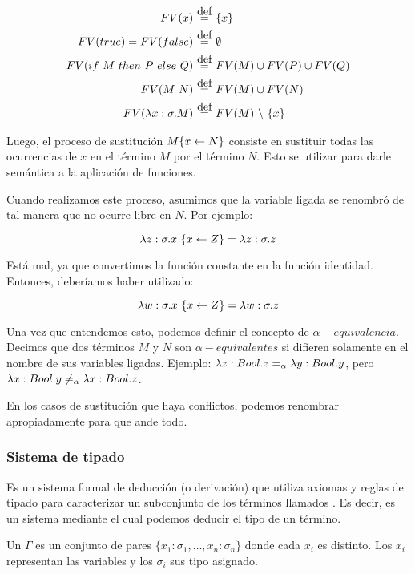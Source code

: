 \begin{align*}
FV(x) &\eqdef \{x\} \\
FV(true) = FV (false) &\eqdef \emptyset \\
FV(\ifte{M}{P}{Q}) &\eqdef FV(M) \cup FV(P) \cup FV(Q) \\
FV(\app{M}{N}) &\eqdef FV(M) \cup FV(N) \\
FV(\abs{x}{\sigma}{M}) &\eqdef FV(M)\ \backslash\ \{x\} \\
\end{align*}

Luego, el proceso de sustitución $M\{x \leftarrow N\}$ consiste en sustituir todas las ocurrencias  de $x$ en el término $M$ por el término $N$. Esto se utilizar para darle semántica a la aplicación de funciones.

Cuando realizamos este proceso, asumimos que la variable ligada se renombró de tal manera que no ocurre libre en $N$. Por ejemplo:

\[ \lambda z:\sigma.x\ \{x\leftarrow Z\} = \lambda z:\sigma.z\]

Está mal, ya que convertimos la función constante  en la función identidad. Entonces, deberíamos haber utilizado:

\[ \lambda w:\sigma.x\ \{x\leftarrow Z\} = \lambda w:\sigma.z\]

Una vez que entendemos esto, podemos definir el concepto de $\alpha-equivalencia$. Decimos que dos términos $M$ y $N$ son $\alpha-equivalentes$ si difieren solamente en el nombre de sus variables ligadas. Ejemplo: $\lambda z:Bool.z =_{\alpha} \lambda y:Bool.y$, pero $\lambda x:Bool.y \neq_{\alpha} \lambda x:Bool.z$.

En los casos de sustitución que haya conflictos, podemos renombrar apropiadamente para que ande todo.

\subsubsection{Sistema de tipado}

Es un sistema formal de deducción (o derivación) que utiliza axiomas y reglas de tipado para caracterizar un subconjunto de los términos llamados . Es decir, es un sistema mediante el cual podemos deducir el tipo de un término.

Un  $\Gamma$ es un conjunto de pares $\{x_1:\sigma_1,\dots,x_n:\sigma_n\}$ donde cada $x_i$ es distinto. Los $x_i$ representan las variables y los $\sigma_i$ sus tipo asignado.


